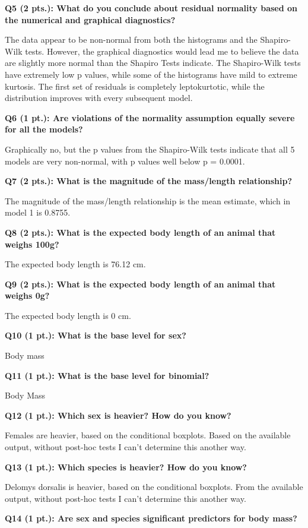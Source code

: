 \documentclass[
]{article}
\begin{document}
\textbf{Q5 (2 pts.): What do you conclude about residual normality based
on the numerical and graphical diagnostics?}

The data appear to be non-normal from both the histograms and the
Shapiro-Wilk tests. However, the graphical diagnostics would lead me to
believe the data are slightly more normal than the Shapiro Tests
indicate. The Shapiro-Wilk tests have extremely low p values, while some
of the histograms have mild to extreme kurtosis. The first set of
residuals is completely leptokurtotic, while the distribution improves
with every subsequent model.

\textbf{Q6 (1 pt.): Are violations of the normality assumption equally
severe for all the models?}

Graphically no, but the p values from the Shapiro-Wilk tests indicate
that all 5 models are very non-normal, with p values well below p =
0.0001.

\textbf{Q7 (2 pts.): What is the magnitude of the mass/length
relationship?}

The magnitude of the mass/length relationship is the mean estimate,
which in model 1 is 0.8755.

\textbf{Q8 (2 pts.): What is the expected body length of an animal that
weighs 100g?}

The expected body length is 76.12 cm.

\textbf{Q9 (2 pts.): What is the expected body length of an animal that
weighs 0g?}

The expected body length is 0 cm.

\textbf{Q10 (1 pt.): What is the base level for sex?}

Body mass

\textbf{Q11 (1 pt.): What is the base level for binomial?}

Body Mass

\textbf{Q12 (1 pt.): Which sex is heavier? How do you know?}

Females are heavier, based on the conditional boxplots. Based on the
available output, without post-hoc tests I can't determine this another
way.

\textbf{Q13 (1 pt.): Which species is heavier? How do you know?}

Delomys dorsalis is heavier, based on the conditional boxplots. From the
available output, without post-hoc tests I can't determine this another
way.

\textbf{Q14 (1 pt.): Are sex and species significant predictors for body
mass?}
\end{document}
